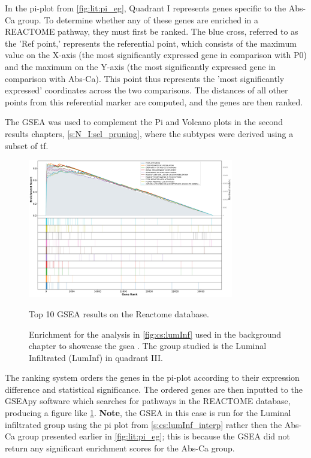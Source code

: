 In the pi-plot from \cref{fig:lit:pi_eg}, Quadrant I represents genes specific to the Abs-Ca group. To determine whether any of these genes are enriched in a REACTOME pathway, they must first be ranked. The blue cross, referred to as the 'Ref point,' represents the referential point, which consists of the maximum value on the X-axis (the most significantly expressed gene in comparison with P0) and the maximum on the Y-axis (the most significantly expressed gene in comparison with Abs-Ca). This point thus represents the 'most significantly expressed' coordinates across the two comparisons. The distances of all other points from this referential marker are computed, and the genes are then ranked. 

The GSEA was used to complement the Pi and Volcano plots in the second results chapters, \cref{s:N_I:sel_pruning}, where the subtypes were derived using a subset of \acrlong{tf}.

\begin{figure}[!htb]
    \centering
    \includegraphics[width=0.8\textwidth, keepaspectratio]{Sections/ClusteringAnalysis/Resources/discussion/other_groups/lumInf_reactome_10_top.png}
        \caption{Top 10 GSEA results on the Reactome database.}
    \caption{Enrichment for the analysis in \cref{fig:cs:lumInf} used in the background chapter to showcase the \acrshort{gsea} . The group studied is the Luminal Infiltrated (LumInf) in quadrant III.}
    \label{fig:lit:gsea_eg}
\end{figure}

The ranking system orders the genes in the pi-plot according to their expression difference and statistical significance. The ordered genes are then inputted to the GSEApy software which searches for pathways in the REACTOME database, producing a figure like \cref{fig:lit:gsea_eg}. \textbf{Note}, the GSEA in this case is run for the Luminal infiltrated group using the pi plot from \cref{s:cs:lumInf_interp} rather then the Abs-Ca group presented earlier in \cref{fig:lit:pi_eg}; this is because the GSEA did not return any significant enrichment scores for the Abs-Ca group.

